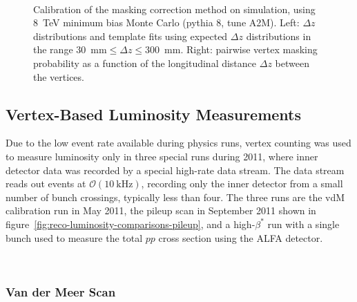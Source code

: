 \begin{figure}[p]
{	}
	\\
	\caption{Calibration of the masking correction method on simulation, using 8~TeV minimum bias Monte Carlo (pythia 8, tune A2M). Left: $\Delta z$ distributions and template fits using expected $\Delta z$ distributions in the range $30$~mm$\leq\Delta z\leq300$~mm. Right: pairwise vertex masking probability as a function of the longitudinal distance $\Delta z$ between the vertices.}
	\label{fig:masking-correction-mc}
\end{figure}

\subsection{Vertex-Based Luminosity Measurements}
Due to the low event rate available during physics runs, vertex counting was used to measure luminosity only in three special runs during 2011, where inner detector data was recorded by a special high-rate data stream. The data stream reads out events at $\mathcal{O}(\SI{10}{\kilo\hertz})$, recording only the inner detector from a small number of bunch crossings, typically less than four. The three runs are the vdM calibration run in May 2011, the pileup scan in September 2011 shown in figure~\ref{fig:reco-luminosity-comparisons-pileup}, and a high-$\beta^{*}$ run with a single bunch used to measure the total $pp$ cross section using the ALFA detector. 

\ 

\subsubsection{Van der Meer Scan}

